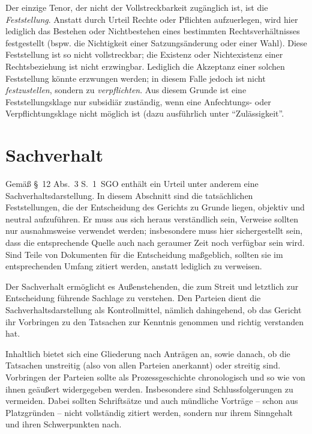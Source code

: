 Der einzige Tenor, der nicht der Vollstreckbarkeit zugänglich ist, ist die \emph{Feststellung}. Anstatt durch Urteil Rechte oder Pflichten aufzuerlegen, wird hier lediglich das Bestehen oder Nichtbestehen eines bestimmten Rechtsverhältnisses festgestellt (bspw. die Nichtigkeit einer Satzungsänderung oder einer Wahl). Diese Feststellung ist so nicht vollstreckbar; die Existenz oder Nichtexistenz einer Rechtsbeziehung ist nicht erzwingbar. Lediglich die Akzeptanz einer solchen Feststellung könnte erzwungen werden; in diesem Falle jedoch ist nicht \emph{festzustellen}, sondern zu \emph{verpflichten}. Aus diesem Grunde ist eine Feststellungsklage nur subsidiär zuständig, wenn eine Anfechtungs- oder Verpflichtungsklage nicht möglich ist (dazu ausführlich unter \enquote{Zulässigkeit}.

\section{Sachverhalt}
Gemäß \S~12 Abs.~3 S.~1~SGO enthält ein Urteil unter anderem eine Sachverhaltsdarstellung. In diesem Abschnitt sind die tatsächlichen Feststellungen, die der Entscheidung des Gerichts zu Grunde liegen, objektiv und neutral aufzuführen. Er muss aus sich heraus verständlich sein, Verweise sollten nur ausnahmsweise verwendet werden; insbesondere muss hier sichergestellt sein, dass die entsprechende Quelle auch nach geraumer Zeit noch verfügbar sein wird. Sind Teile von Dokumenten für die Entscheidung maßgeblich, sollten sie im entsprechenden Umfang zitiert werden, anstatt lediglich zu verweisen.

Der Sachverhalt ermöglicht es Außenstehenden, die zum Streit und letztlich zur Entscheidung führende Sachlage zu verstehen. Den Parteien dient die Sachverhaltsdarstellung als Kontrollmittel, nämlich dahingehend, ob das Gericht ihr Vorbringen zu den Tatsachen zur Kenntnis genommen und richtig verstanden hat.

Inhaltlich bietet sich eine Gliederung nach Anträgen an, sowie danach, ob die Tatsachen unstreitig (also von allen Parteien anerkannt) oder streitig sind. Vorbringen der Parteien sollte als Prozessgeschichte chronologisch und so wie von ihnen geäußert widergegeben werden. Insbesondere sind Schlussfolgerungen zu vermeiden. Dabei sollten Schriftsätze und auch mündliche Vorträge – schon aus Platzgründen – nicht vollständig zitiert werden, sondern nur ihrem Sinngehalt und ihren Schwerpunkten nach.

